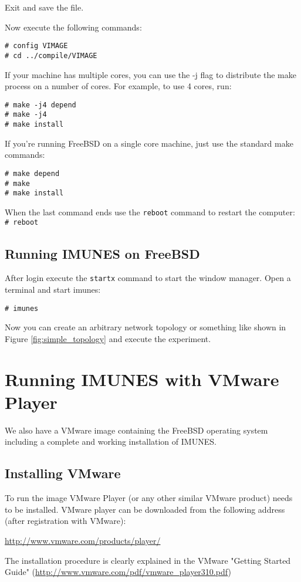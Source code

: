 Exit and save the file.

Now execute the following commands:
\begin{verbatim}
# config VIMAGE
# cd ../compile/VIMAGE
\end{verbatim}

If your machine has multiple cores, you can use the -j flag to distribute the make
process on a number of cores. For example, to use 4 cores, run:
\begin{verbatim}
# make -j4 depend
# make -j4
# make install
\end{verbatim}

If you're running FreeBSD on a single core machine, just use the standard make
commands:
\begin{verbatim}
# make depend
# make
# make install
\end{verbatim}

When the last command ends use the \texttt{reboot} command to restart the
computer: \\
\texttt{\# reboot}

\subsection{Running IMUNES on FreeBSD}

After login execute the \texttt{startx} command to start the window manager.
Open a terminal and start imunes:

\texttt{\# imunes}

Now you can create an arbitrary network topology or something like shown in
Figure \ref{fig:simple_topology} and execute the experiment.

\section{Running IMUNES with VMware Player}

We also have a VMware image containing the FreeBSD operating system including a
complete and working installation of IMUNES.

\subsection{Installing VMware}
To run the image VMware Player (or any other similar VMware product) needs to be
installed. VMware player can be downloaded from the following address (after
registration with VMware):
\begin{center}
\url{http://www.vmware.com/products/player/}
\end{center}
The installation procedure is clearly explained in the VMware "Getting Started
Guide" (\url{http://www.vmware.com/pdf/vmware_player310.pdf})

